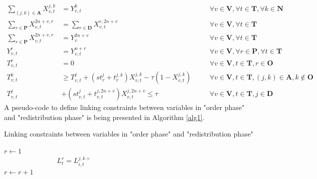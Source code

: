 \documentclass[12pt,a4paper]{article}
\begin{document}
\begin{align}
\sum_{(j,k)\in \textbf{A}} X_{v,t}^{j,k} & = Y_{v,t}^{k} && \quad \forall v \in \textbf{V}, \forall t \in \textbf{T}, \forall k \in \textbf{N}\\
\sum_{r \in \textbf{P}} X_{v,t}^{2n+v,r} & = \sum_{r \in \textbf{D}} X_{v,t}^{r,2n+v} && \quad \forall v \in \textbf{V}, \forall t \in \textbf{T} \\
\sum_{r \in \textbf{P}} X_{v,t}^{2n+v,r} & = Y_{v}^{2n+v} && \quad \forall v \in \textbf{V}, \forall t \in \textbf{T}\\
Y_{v,t}^{r} & = Y_{v,t}^{n+r} && \quad \forall v \in \textbf{V}, \forall r \in \textbf{P}, \forall t \in \textbf{T} \\
T_{v,t}^{r} & = 0 && \quad \forall v \in \textbf{V}, t \in \textbf{T}, r \in \textbf{O} \\
T_{v,t}^{k} & \geq T_{v,t}^{j}+(st_{v}^{j}+t_{v}^{j,k})X_{v,t}^{j,k}-\tau (1-X_{v,t}^{j,k}) && \quad \forall v \in \textbf{V}, t \in \textbf{T}, (j,k) \in \textbf{A}, k \not \in \textbf{O} \\
T_{v,t}^{j} & +(st_{v,t}^{j}+t_{v,t}^{j,2n+v})X_{v,t}^{j,2n+v} \leq \tau && \quad \forall v \in \textbf{V}, t \in \textbf{T}, j \in \textbf{D} 
\end{align}
A pseudo-code to define linking constraints between variables in "order phase" and "redistribution phase" is being presented in Algorithm \ref{alg1}.

\begin{algorithm}[H]
\caption{Linking constraints between variables in "order phase" and "redistribution phase"}
\label{alg1}
\begin{algorithmic}
\STATE $r \leftarrow 1$
 \STATE \begin{equation} L_{t}^{r} = L_{i,t}^{j,k{+}}  \qquad \qquad \qquad \qquad  \qquad \qquad \qquad \qquad \label{eq:link}
\end{equation} \STATE $r \leftarrow r+1$ 
\ENDIF
\ENDFOR
\ENDFOR
\ENDFOR
\end{algorithmic}
\end{algorithm} 
\end{document}
